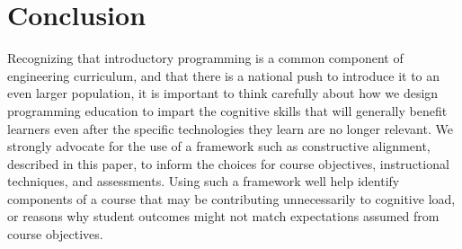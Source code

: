 \documentclass[12pt]{article}
\let\textcite=\autocite
\begin{document}
\section{Conclusion}

Recognizing that introductory programming is a common component of
engineering curriculum, and that there is a national push to introduce
it to an even larger population, it is important to think carefully
about how we design programming education to impart the cognitive
skills that will generally benefit learners even after the specific
technologies they learn are no longer relevant. We strongly advocate
for the use of a framework such as constructive alignment, described in
this paper, to inform the choices for course objectives, instructional
techniques, and assessments. Using such a framework well help identify
components of a course that may be contributing unnecessarily to
cognitive load, or reasons why student outcomes might not match
expectations assumed from course objectives.


\end{document}

